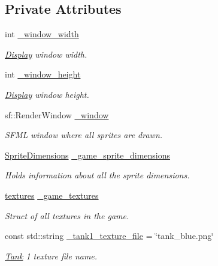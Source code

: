 \subsection*{Private Attributes}
\begin{DoxyCompactItemize}
\item 
int \hyperlink{classDisplay_a715bf4b76abf3b8a8cc495cbb7dfd4b0}{\-\_\-window\-\_\-width}
\begin{DoxyCompactList}\small\item\em \hyperlink{classDisplay}{Display} window width. \end{DoxyCompactList}\item 
int \hyperlink{classDisplay_a3e66e647786a79f49b985d45e1ad4ac2}{\-\_\-window\-\_\-height}
\begin{DoxyCompactList}\small\item\em \hyperlink{classDisplay}{Display} window height. \end{DoxyCompactList}\item 
sf\-::\-Render\-Window \hyperlink{classDisplay_aeb0bd9ad8ee786de5f4f0f7c738b1b11}{\-\_\-window}
\begin{DoxyCompactList}\small\item\em S\-F\-M\-L window where all sprites are drawn. \end{DoxyCompactList}\item 
\hyperlink{classSpriteDimensions}{Sprite\-Dimensions} \hyperlink{classDisplay_acf0a20ec8a01c1917d62f20ddf2d2f51}{\-\_\-game\-\_\-sprite\-\_\-dimensions}
\begin{DoxyCompactList}\small\item\em Holds information about all the sprite dimensions. \end{DoxyCompactList}\item 
\hyperlink{structtextures}{textures} \hyperlink{classDisplay_a64ae525710346f1a982efa05b8c53a88}{\-\_\-game\-\_\-textures}
\begin{DoxyCompactList}\small\item\em Struct of all textures in the game. \end{DoxyCompactList}\item 
const std\-::string \hyperlink{classDisplay_a4055ddd33815347b986bb7437bdc1c79}{\-\_\-tank1\-\_\-texture\-\_\-file} = \char`\"{}tank\-\_\-blue.\-png\char`\"{}
\begin{DoxyCompactList}\small\item\em \hyperlink{classTank}{Tank} 1 texture file name. \end{DoxyCompactList}\item 

\end{DoxyCompactItemize}
